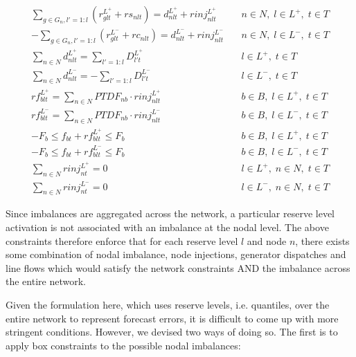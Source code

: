 \documentclass[number,times]{elsarticle}
\begin{document}
\begin{align}
    \sum_{g \in G_n, l'=1:l} (r^{L^+}_{glt} + rs_{nlt}) = d^{L^+}_{nlt} + rinj^{L^+}_{nlt}   & \quad n \in N, \; l \in L^+, \; t \in T \\
    - \sum_{g \in G_n, l'=1:l} (r^{L^-}_{glt} + rc_{nlt}) = d^{L^-}_{nlt} + rinj^{L^-}_{nlt} & \quad n \in N, \; l \in L^-, \; t \in T \\
    \sum_{n \in N} d^{L^+}_{nlt} = \sum_{l'=1:l} D^{L^+}_{l't}                               & \quad l \in L^+, \; t \in T             \\
    \sum_{n \in N} d^{L^-}_{nlt} = - \sum_{l'=1:l} D^{L^-}_{l't}                             & \quad l \in L^-, \; t \in T             \\
    rf^{L^+}_{blt} = \sum_{n \in N} PTDF_{nb} \cdot rinj^{L^+}_{nlt}                         & \quad b \in B, \; l \in L^+, \; t \in T \\
    rf^{L^-}_{blt} = \sum_{n \in N} PTDF_{nb} \cdot rinj^{L^-}_{nlt}                         & \quad b \in B, \; l \in L^-, \; t \in T \\
    -F_{b} \leq f_{bt} + rf^{L^+}_{blt} \leq F_b                                             & \quad b \in B, \; l \in L^+, \; t \in T \\
    -F_{b} \leq f_{bt} + rf^{L^-}_{blt} \leq F_b                                             & \quad b \in B, \; l \in L^-, \; t \in T \\
    \sum_{n \in N} rinj^{L^+}_{nt} = 0                                                       & \quad l \in L^+, \; n \in N, \; t \in T \\
    \sum_{n \in N} rinj^{L^-}_{nt} = 0                                                       & \quad l \in L^-, \; n \in N, \; t \in T
\end{align}

Since imbalances are aggregated across the network, a particular reserve level activation is not associated with an imbalance at the nodal level. The above constraints therefore enforce that for each reserve level $l$ and node $n$, there exists some combination of nodal imbalance, node injections, generator dispatches and line flows which would satisfy the network constraints AND the imbalance across the entire network. 

Given the formulation here, which uses reserve levels, i.e. quantiles, over the entire network to represent forecast errors, it is difficult to come up with more stringent conditions. However, we devised two ways of doing so. The first is to apply box constraints to the possible nodal imbalances:
\end{document}
